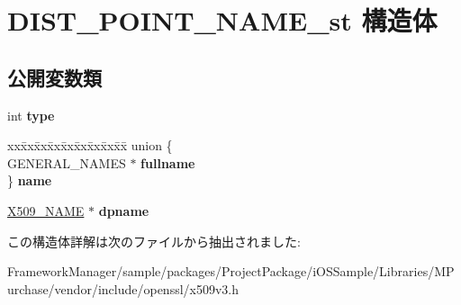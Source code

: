 \hypertarget{struct_d_i_s_t___p_o_i_n_t___n_a_m_e__st}{}\section{D\+I\+S\+T\+\_\+\+P\+O\+I\+N\+T\+\_\+\+N\+A\+M\+E\+\_\+st 構造体}
\label{struct_d_i_s_t___p_o_i_n_t___n_a_m_e__st}
\subsection*{公開変数類}
\begin{DoxyCompactItemize}
\item 
\hypertarget{struct_d_i_s_t___p_o_i_n_t___n_a_m_e__st_a86c9aa0170afe2c241c5536f45d15b46}{}int {\bfseries type}\label{struct_d_i_s_t___p_o_i_n_t___n_a_m_e__st_a86c9aa0170afe2c241c5536f45d15b46}

\item 
\hypertarget{struct_d_i_s_t___p_o_i_n_t___n_a_m_e__st_a56ec7eebee26489b19530a8da7386aee}{}\begin{tabbing}
xx\=xx\=xx\=xx\=xx\=xx\=xx\=xx\=xx\=\kill
union \{\\
\>GENERAL\_NAMES $\ast$ {\bfseries fullname}\\
\} {\bfseries name}\label{struct_d_i_s_t___p_o_i_n_t___n_a_m_e__st_a56ec7eebee26489b19530a8da7386aee}
\\

\end{tabbing}\item 
\hypertarget{struct_d_i_s_t___p_o_i_n_t___n_a_m_e__st_a59bb0b428b4067a642f1fecfce319600}{}\hyperlink{struct_x509__name__st}{X509\+\_\+\+N\+A\+M\+E} $\ast$ {\bfseries dpname}\label{struct_d_i_s_t___p_o_i_n_t___n_a_m_e__st_a59bb0b428b4067a642f1fecfce319600}

\end{DoxyCompactItemize}


この構造体詳解は次のファイルから抽出されました\+:\begin{DoxyCompactItemize}
\item 
Framework\+Manager/sample/packages/\+Project\+Package/i\+O\+S\+Sample/\+Libraries/\+M\+Purchase/vendor/include/openssl/x509v3.\+h\end{DoxyCompactItemize}
